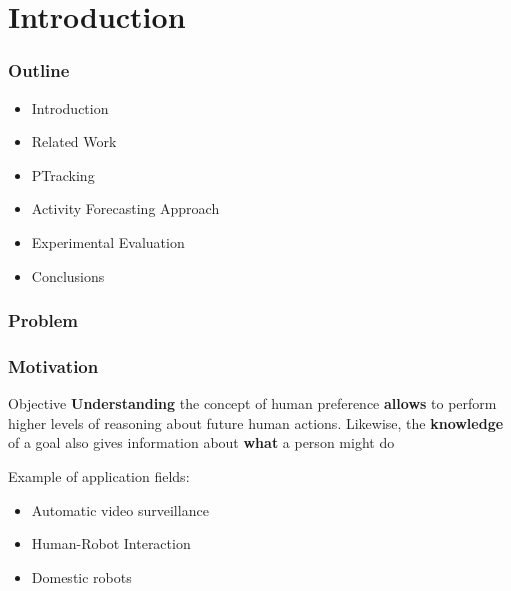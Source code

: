 \section{Introduction}

\begin{frame}
	\frametitle{Outline}
	
	\LARGE
	
	\begin{itemize}
		\item Introduction
		\item Related Work
		\item PTracking
		\item Activity Forecasting Approach
		\item Experimental Evaluation
		\item Conclusions
	\end{itemize}
\end{frame}

\begin{frame}
	\frametitle{Problem}
	
	\begin{center}
	\end{center}
\end{frame}

\begin{frame}
	\frametitle{Motivation}
	
	\vspace{0.2cm}
	
	\Large
	
	\begin{block}{Objective}
		\textbf{Understanding} the concept of human preference \textbf{allows} to perform higher levels
		of reasoning about future human actions. Likewise, the \textbf{knowledge} of a goal also gives
		information about \textbf{what} a person might do
	\end{block}
	
	\vspace{0.3cm}
	
	Example of application fields:
	\begin{itemize}
		\item Automatic video surveillance
		\item Human-Robot Interaction
		\item Domestic robots
	\end{itemize}
\end{frame}

